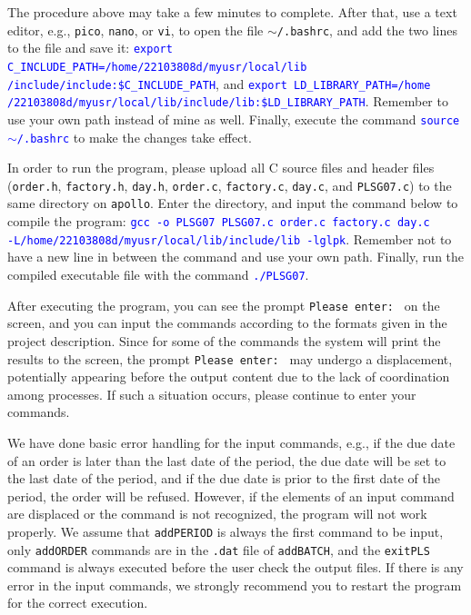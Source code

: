 \documentclass[a4paper, 12pt]{article}
\begin{document}
The procedure above may take a few minutes to complete. After that, 
use a text editor, e.g., \texttt{pico}, \texttt{nano}, or \texttt{vi}, to open the file \texttt{$\sim$/.bashrc}, and add the two lines to the file and save it:
\textcolor{blue}{\texttt{export C\_INCLUDE\_PATH=/home/22103808d/myusr/local/lib\\/include/include:\$C\_INCLUDE\_PATH}}, and
\textcolor{blue}{\texttt{export LD\_LIBRARY\_PATH=/home\\/22103808d/myusr/local/lib/include/lib:\$LD\_LIBRARY\_PATH}}. Remember 
to use your own path instead of mine as well.
Finally, execute the command \textcolor{blue}{\texttt{source $\sim$/.bashrc}} to make the changes take effect.

In order to run the program, please upload all C source files and header files (\texttt{order.h}, \texttt{factory.h}, \texttt{day.h}, \texttt{order.c}, \texttt{factory.c}, \texttt{day.c}, and \texttt{PLS\textunderscore G07.c})
to the same directory on \texttt{apollo}. Enter the directory, and input the command below to compile the program:
\textcolor{blue}{\texttt{gcc -o PLS\textunderscore G07 PLS\textunderscore G07.c order.c factory.c day.c \\-L/home/22103808d/myusr/local/lib/include/lib -lglpk}}.
Remember not to have a new line in between the command and use your own path. Finally, run the compiled executable file with the command
\textcolor{blue}{\texttt{./PLS\textunderscore G07}}.

After executing the program, you can see the prompt \texttt{Please enter: } on the screen, and you can input the commands according to the formats given in the project description.
Since for some of the commands the system will print the results to the screen, the prompt \texttt{Please enter: } may undergo a displacement, 
potentially appearing before the output content due to the lack of coordination among processes. If such a situation occurs, please continue to enter your commands.

We have done basic error handling for the input commands, e.g., if the due date of an order is later than the last date of the period, the due date will be set to the last date of the period, and 
if the due date is prior to the first date of the period, the order will be refused. However, if the elements of an input command are displaced or the command is not recognized, the program will not work properly.
We assume that \texttt{addPERIOD} is always the first command to be input, only \texttt{addORDER} commands are in the \texttt{.dat} file of \texttt{addBATCH}, and the \texttt{exitPLS} command is always executed before the user check the output files. If there is any error in the input commands, 
we strongly recommend you to restart the program for the correct execution.
\end{document}
